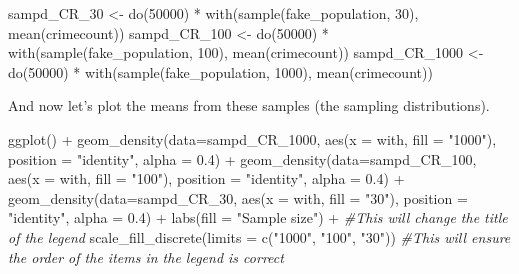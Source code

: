 \documentclass[
]{book}
\newenvironment{Shaded}{\begin{snugshade}}{\end{snugshade}}
\newcommand{\AttributeTok}[1]{\textcolor[rgb]{0.77,0.63,0.00}{#1}}
\newcommand{\CommentTok}[1]{\textcolor[rgb]{0.56,0.35,0.01}{\textit{#1}}}
\newcommand{\DecValTok}[1]{\textcolor[rgb]{0.00,0.00,0.81}{#1}}
\newcommand{\FloatTok}[1]{\textcolor[rgb]{0.00,0.00,0.81}{#1}}
\newcommand{\FunctionTok}[1]{\textcolor[rgb]{0.00,0.00,0.00}{#1}}
\newcommand{\NormalTok}[1]{#1}
\newcommand{\OtherTok}[1]{\textcolor[rgb]{0.56,0.35,0.01}{#1}}
\newcommand{\SpecialCharTok}[1]{\textcolor[rgb]{0.00,0.00,0.00}{#1}}
\newcommand{\StringTok}[1]{\textcolor[rgb]{0.31,0.60,0.02}{#1}}
\begin{document}
\begin{Shaded}
\begin{Highlighting}[]
\NormalTok{sampd\_CR\_30 }\OtherTok{\textless{}{-}} \FunctionTok{do}\NormalTok{(}\DecValTok{50000}\NormalTok{) }\SpecialCharTok{*} \FunctionTok{with}\NormalTok{(}\FunctionTok{sample}\NormalTok{(fake\_population, }\DecValTok{30}\NormalTok{), }\FunctionTok{mean}\NormalTok{(crimecount))}
\NormalTok{sampd\_CR\_100 }\OtherTok{\textless{}{-}} \FunctionTok{do}\NormalTok{(}\DecValTok{50000}\NormalTok{) }\SpecialCharTok{*} \FunctionTok{with}\NormalTok{(}\FunctionTok{sample}\NormalTok{(fake\_population, }\DecValTok{100}\NormalTok{), }\FunctionTok{mean}\NormalTok{(crimecount))}
\NormalTok{sampd\_CR\_1000 }\OtherTok{\textless{}{-}} \FunctionTok{do}\NormalTok{(}\DecValTok{50000}\NormalTok{) }\SpecialCharTok{*} \FunctionTok{with}\NormalTok{(}\FunctionTok{sample}\NormalTok{(fake\_population, }\DecValTok{1000}\NormalTok{), }\FunctionTok{mean}\NormalTok{(crimecount))}
\end{Highlighting}
\end{Shaded}

And now let's plot the means from these samples (the sampling distributions).

\begin{Shaded}
\begin{Highlighting}[]
\FunctionTok{ggplot}\NormalTok{() }\SpecialCharTok{+} 
    \FunctionTok{geom\_density}\NormalTok{(}\AttributeTok{data=}\NormalTok{sampd\_CR\_1000, }\FunctionTok{aes}\NormalTok{(}\AttributeTok{x =}\NormalTok{ with, }\AttributeTok{fill =} \StringTok{"1000"}\NormalTok{), }\AttributeTok{position =} \StringTok{"identity"}\NormalTok{, }\AttributeTok{alpha =} \FloatTok{0.4}\NormalTok{) }\SpecialCharTok{+}
   \FunctionTok{geom\_density}\NormalTok{(}\AttributeTok{data=}\NormalTok{sampd\_CR\_100, }\FunctionTok{aes}\NormalTok{(}\AttributeTok{x =}\NormalTok{ with, }\AttributeTok{fill =} \StringTok{"100"}\NormalTok{), }\AttributeTok{position =} \StringTok{"identity"}\NormalTok{, }\AttributeTok{alpha =} \FloatTok{0.4}\NormalTok{) }\SpecialCharTok{+}
   \FunctionTok{geom\_density}\NormalTok{(}\AttributeTok{data=}\NormalTok{sampd\_CR\_30, }\FunctionTok{aes}\NormalTok{(}\AttributeTok{x =}\NormalTok{ with, }\AttributeTok{fill =} \StringTok{"30"}\NormalTok{), }\AttributeTok{position =} \StringTok{"identity"}\NormalTok{, }\AttributeTok{alpha =} \FloatTok{0.4}\NormalTok{) }\SpecialCharTok{+}
  \FunctionTok{labs}\NormalTok{(}\AttributeTok{fill =} \StringTok{"Sample size"}\NormalTok{) }\SpecialCharTok{+} \CommentTok{\#This will change the title of the legend}
  \FunctionTok{scale\_fill\_discrete}\NormalTok{(}\AttributeTok{limits =} \FunctionTok{c}\NormalTok{(}\StringTok{"1000"}\NormalTok{, }\StringTok{"100"}\NormalTok{, }\StringTok{"30"}\NormalTok{)) }\CommentTok{\#This will ensure the order of the items in the legend is correct}
\end{Highlighting}
\end{Shaded}
\end{document}
